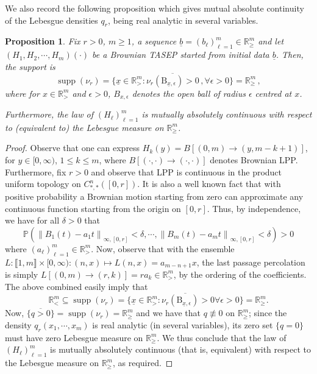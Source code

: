\documentclass[11pt, reqno]{amsart}
\numberwithin{equation}{section}
\newcounter{dummy} \numberwithin{dummy}{section}
\newtheorem{proposition}[dummy]{Proposition}
\newcommand{\R}{\ensuremath{\mathbb{R}}}
\newcommand{\PP}{\ensuremath{\mathbb{P}}}
\DeclareMathOperator{\supp}{supp}
\newcommand{\norm}[1]{\left\lVert#1\right\rVert}
\begin{document}
We also record the following proposition which gives mutual absolute continuity of the Lebesgue densities $q_r$, being real analytic in several variables.

\begin{proposition}\label{prop: support density warren}
    Fix $r>0$, $m\ge 1$, a sequence $\underline{b}= (b_\ell)_{\ell =1}^m \in\R^m_{\ge}$ and let $(H_1, H_2, \cdots, H_m)(\cdot)$ be a Brownian TASEP started from initial data $\underline{b}$. Then, the support is
\begin{equation*}
    \supp (\nu_r) = \overline{\{\underline{x}\in \R^m_>: \nu_r(\mathrm{B}_{\underline{x}, \epsilon})>0\,, \forall \epsilon > 0 \}} = \R^m_\ge\,,
\end{equation*}
where for $x\in \R^m_>$ and $\epsilon > 0$, $B_{x, \epsilon}$ denotes the open ball of radius $\epsilon$ centred at $x$. 

Furthermore, the law of $(H_\ell)_{\ell = 1}^m$ is mutually absolutely continuous with respect to (equivalent to) the Lebesgue measure on $\R^m_\ge$.
\end{proposition}

\begin{proof}
 Observe that one can express $H_k(y) = B[(0,m)\to (y, m-k+1)]$, for $y\in [0,\infty)$, $1\le k \le m$, where $B[(\cdot, \cdot)\to (\cdot, \cdot)]$ denotes Brownian LPP. Furthermore, fix $r>0$ and observe that LPP is continuous in the product uniform topology on $C^n_{*,*}([0,r])$. It is also a well known fact that with positive probability a Brownian motion starting from zero can approximate any continuous function starting from the origin on $[0,r]$. Thus, by independence, we have for all $\delta > 0$ that
 \begin{equation*}
     \PP(\norm{B_1(t)-a_1t}_{\infty,[0,r]}<\delta,\cdots, \norm{B_m(t)-a_mt}_{\infty,[0,r]} <\delta) >0
 \end{equation*}
 where $(a_\ell)_{\ell = 1}^m\in \R^m_>$. Now, observe that with the ensemble $L: \llbracket 1, m \rrbracket \times [0,\infty):(n,x)\mapsto L(n, x) = a_{m-n+1}x$, the last passage percolation is simply $L[(0,m)\to (r, k)] = r a_k \in \R^m_>$, by the ordering of the coefficients. The above combined easily imply that 
\begin{equation*}
    \R^m_{<}\subseteq \supp (\nu_r) = \overline{\{\underline{x}\in \R^m_>: \nu_r(\mathrm{B}_{\underline{x}, \epsilon})>0 \forall \epsilon > 0 \}} = \R^m_\ge.
\end{equation*}
 Now, $ \overline{\{q>0\}} = \supp (\nu_r) = \R^m_\ge$ and we have that $q\not\equiv 0$ on $\R^m_\ge$; since the density $q_r(x_1, \cdots, x_m)$ is real analytic (in several variables), its zero set $\{q = 0\}$ must have zero Lebesgue measure on $\R^m_\ge$. We thus conclude that the law of $(H_\ell)_{\ell = 1}^m$ is mutually absolutely continuous (that is, equivalent) with respect to the Lebesgue measure on $\R^m_\ge$, as required.
\end{proof}
\end{document}
